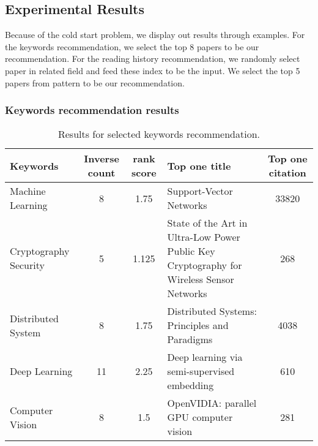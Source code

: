 \subsection{Experimental Results}
%
Because of the cold start problem, we display out results through examples. For the keywords recommendation, we select the top 8 papers to be our recommendation. For the reading history recommendation, we randomly select paper in related field and feed these index to be the input. We select the top 5 papers from pattern to be our recommendation.

\subsubsection{Keywords recommendation results}

\begin{table}
	\centering
	\begin{tabular}{lccp{6.5cm}c}
		\toprule
		\textbf{Keywords}	& \textbf{Inverse count} 	& \textbf{rank score} 	&\textbf{Top one title} &\textbf{Top one citation}\\ \midrule
		Machine Learning	& 8					& 1.75			&Support-Vector Networks &33820\\
		Cryptography Security& 5					& 1.125			&State of the Art in Ultra-Low Power Public Key Cryptography for Wireless Sensor Networks &268 \\
		Distributed System	& 8					& 1.75			&Distributed Systems: Principles and Paradigms & 4038\\
		Deep Learning		& 11					& 2.25			&Deep learning via semi-supervised embedding &610\\
		Computer Vision 	& 8					& 1.5				&OpenVIDIA: parallel GPU computer vision & 281\\
		\bottomrule
	\end{tabular}
	\vspace{3mm}
	\caption{Results for selected keywords recommendation. }
	\label{res:keywordall}
\end{table}


